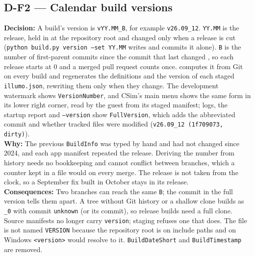 \subsection*{D-F2 --- Calendar build versions}
\begin{decisionbox}[title={D-F2 \quad 2026-09-25}]
\textbf{Decision:} A build's version is \texttt{vYY.MM\_B}, for example
\texttt{v26.09\_12}. \texttt{YY.MM} is the release, held in
 at the repository root and changed only when a release
is cut (\texttt{python build.py version --set YY.MM} writes and commits it
alone). \texttt{B} is the number of first-parent commits since the commit
that last changed , so each release starts at 0 and a
merged pull request counts once.  computes
it from Git on every build and regenerates the 
definitions and the version of each staged \texttt{illumo.json}, rewriting
them only when they change. The development watermark shows
\texttt{VersionNumber}, and CSim's main menu shows the same form in its lower
right corner, read by the guest from its staged manifest; logs, the
startup report and \texttt{--version} show \texttt{FullVersion}, which adds
the abbreviated commit and whether tracked files were modified
(\texttt{v26.09\_12 (1f709073, dirty)}).\\
\textbf{Why:} The previous \texttt{BuildInfo} was typed by hand and had not
changed since 2024, and each app manifest repeated the release. Deriving the
number from history needs no bookkeeping and cannot conflict between
branches, which a counter kept in a file would on every merge. The release
is not taken from the clock, so a September fix built in October stays in
its release.\\
\textbf{Consequences:} Two branches can reach the same \texttt{B}; the commit
in the full version tells them apart. A tree without Git history or a
shallow clone builds as \texttt{\_0} with commit \texttt{unknown} (or its
commit), so release builds need a full clone. Source manifests no longer
carry \texttt{version}; staging refuses one that does. The file is not named
\texttt{VERSION} because the repository root is on include paths and on
Windows \texttt{<version>} would resolve to it. \texttt{BuildDateShort} and
\texttt{BuildTimestamp} are removed.
\end{decisionbox}

